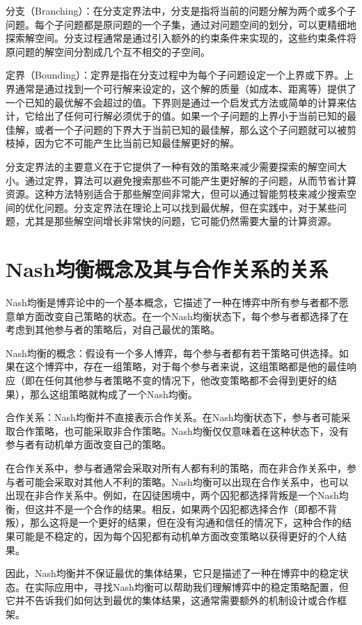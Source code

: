 \documentclass[12pt, a4paper, oneside]{ctexart}
\begin{document}
分支（Branching）：在分支定界法中，分支是指将当前的问题分解为两个或多个子问题。每个子问题都是原问题的一个子集，通过对问题空间的划分，可以更精细地探索解空间。分支过程通常是通过引入额外的约束条件来实现的，这些约束条件将原问题的解空间分割成几个互不相交的子空间。

定界（Bounding）：定界是指在分支过程中为每个子问题设定一个上界或下界。上界通常是通过找到一个可行解来设定的，这个解的质量（如成本、距离等）提供了一个已知的最优解不会超过的值。下界则是通过一个启发式方法或简单的计算来估计，它给出了任何可行解必须优于的值。如果一个子问题的上界小于当前已知的最佳解，或者一个子问题的下界大于当前已知的最佳解，那么这个子问题就可以被剪枝掉，因为它不可能产生比当前已知最佳解更好的解。

分支定界法的主要意义在于它提供了一种有效的策略来减少需要探索的解空间大小。通过定界，算法可以避免搜索那些不可能产生更好解的子问题，从而节省计算资源。这种方法特别适合于那些解空间非常大，但可以通过智能剪枝来减少搜索空间的优化问题。分支定界法在理论上可以找到最优解，但在实践中，对于某些问题，尤其是那些解空间增长非常快的问题，它可能仍然需要大量的计算资源。

\section{Nash均衡概念及其与合作关系的关系}
Nash均衡是博弈论中的一个基本概念，它描述了一种在博弈中所有参与者都不愿意单方面改变自己策略的状态。在一个Nash均衡状态下，每个参与者都选择了在考虑到其他参与者的策略后，对自己最优的策略。

Nash均衡的概念：假设有一个多人博弈，每个参与者都有若干策略可供选择。如果在这个博弈中，存在一组策略，对于每个参与者来说，这组策略都是他的最佳响应（即在任何其他参与者策略不变的情况下，他改变策略都不会得到更好的结果），那么这组策略就构成了一个Nash均衡。

合作关系：Nash均衡并不直接表示合作关系。在Nash均衡状态下，参与者可能采取合作策略，也可能采取非合作策略。Nash均衡仅仅意味着在这种状态下，没有参与者有动机单方面改变自己的策略。

在合作关系中，参与者通常会采取对所有人都有利的策略，而在非合作关系中，参与者可能会采取对其他人不利的策略。Nash均衡可以出现在合作关系中，也可以出现在非合作关系中。例如，在囚徒困境中，两个囚犯都选择背叛是一个Nash均衡，但这并不是一个合作的结果。相反，如果两个囚犯都选择合作（即都不背叛），那么这将是一个更好的结果，但在没有沟通和信任的情况下，这种合作的结果可能是不稳定的，因为每个囚犯都有动机单方面改变策略以获得更好的个人结果。

因此，Nash均衡并不保证最优的集体结果，它只是描述了一种在博弈中的稳定状态。在实际应用中，寻找Nash均衡可以帮助我们理解博弈中的稳定策略配置，但它并不告诉我们如何达到最优的集体结果，这通常需要额外的机制设计或合作框架。
\end{document}

